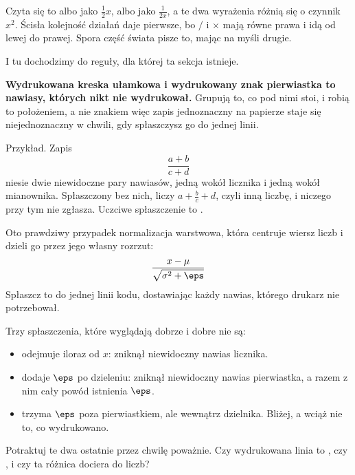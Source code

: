\begin{fr}
\begin{ansblock}
Czyta się to albo jako $\frac{1}{2}x$, albo jako $\frac{1}{2x}$, a te dwa
wyrażenia różnią się o czynnik $x^{2}$. Ścisła kolejność działań daje pierwsze,
bo $/$ i $\times$ mają równe prawa i idą od lewej do prawej. Spora część świata
pisze to, mając na myśli drugie.

\end{ansblock}

I tu dochodzimy do reguły, dla której ta sekcja istnieje.

\textbf{Wydrukowana kreska ułamkowa i wydrukowany znak pierwiastka to nawiasy,
których nikt nie wydrukował.} Grupują to, co pod nimi stoi, i robią to
położeniem, a nie znakiem \dash{} więc zapis jednoznaczny na papierze staje się
niejednoznaczny w chwili, gdy spłaszczysz go do jednej linii.

Przykład. Zapis
\[ \frac{a + b}{c + d} \]
niesie dwie niewidoczne pary nawiasów, jedną wokół licznika i jedną wokół
mianownika. Spłaszczony bez nich,  liczy
$a + \frac{b}{c} + d$, czyli inną liczbę, i niczego przy tym nie zgłasza.
Uczciwe spłaszczenie to .

\yourturn
Oto prawdziwy przypadek \dash{} normalizacja warstwowa, która centruje wiersz
liczb i dzieli go przez jego własny rozrzut:
\[ \frac{x - \mu}{\sqrt{\sigma^{2} + \eps}} \]
Spłaszcz to do jednej linii kodu, dostawiając każdy nawias, którego drukarz nie
potrzebował.
\dotline
\nextframe
\end{fr}

\begin{fr}
\begin{ansblock}
\begin{center}
\end{center}
Trzy spłaszczenia, które wyglądają dobrze i dobre nie są:

\begin{itemize}
\item {} odejmuje iloraz od $x$: zniknął
  niewidoczny nawias licznika.
\item {} dodaje $\eps$ po dzieleniu: zniknął
  niewidoczny nawias pierwiastka, a razem z nim cały powód istnienia $\eps$.
\item {} trzyma $\eps$ poza pierwiastkiem,
  ale wewnątrz dzielnika. Bliżej, a wciąż nie to, co wydrukowano.
\end{itemize}
\end{ansblock}

Potraktuj te dwa ostatnie przez chwilę poważnie. Czy wydrukowana linia to
, czy , i czy ta różnica
dociera do liczb?
\nextframe
\end{fr}

